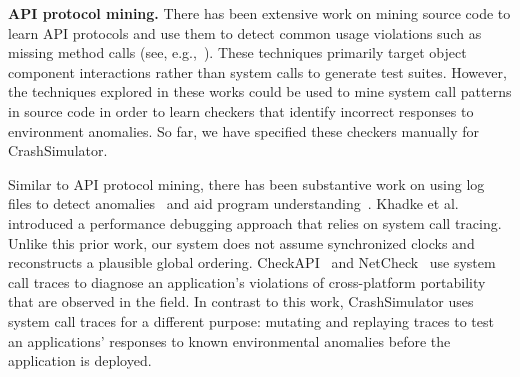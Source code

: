 \iffalse
\noindent
{\bf Specification and run-time verification.}  Substantial work has
been done in validating API and protocol behaviors, e.g., finding
faults in the Linux TCP implementation,
SSH2 and RCP~\cite{Udrea:2008}, BGP
configuration~\cite{Feamster:2005}, and identifying network
vulnerabilities~\cite{ritchey-sp00}. 
\fi

\noindent
{\bf API protocol mining.}
There has been extensive work on mining source code to learn API
protocols and use them to detect common usage violations such as
missing method calls (see, e.g.,~\cite{mariani2007compatibility,
  DBLP:journals/ase/WasylkowskiZ11, DBLP:conf/icse/PradelJAG12,
  DBLP:journals/tosem/MonperrusM13,
  DBLP:conf/icse/JamrozikSZ16}). These techniques primarily target
object component interactions rather than system calls to generate
test suites. However, the techniques explored in these works could be
used to mine system call patterns in source code in order to learn
checkers that identify incorrect responses to environment
anomalies. So far, we have specified these checkers manually for
CrashSimulator.

Similar to API protocol mining, there has been substantive work on
using log files to detect anomalies~\cite{pinpoint,
  jiang_abnormal_trace_detection_icac_2005, xu2009detecting,
  lou2010mining2} and aid program understanding~\cite{yuan2010sherlog,
  beschastnikh_synoptic_fse_2011, csight_icse_2014}.
Khadke et al.~\cite{khadketransparent} introduced a performance
debugging approach that relies on system call tracing. Unlike this
prior work, our system does not assume synchronized clocks and
reconstructs a plausible global ordering.
CheckAPI~\cite{rasley2015detecting} and
NetCheck~\cite{Zhuang_NSDI_2014} use system call traces to diagnose an
application's violations of cross-platform portability that are
observed in the field. In contrast to this work, CrashSimulator uses
system call traces for a different purpose: mutating and replaying
traces to test an applications' responses to known environmental
anomalies before the application is deployed.


